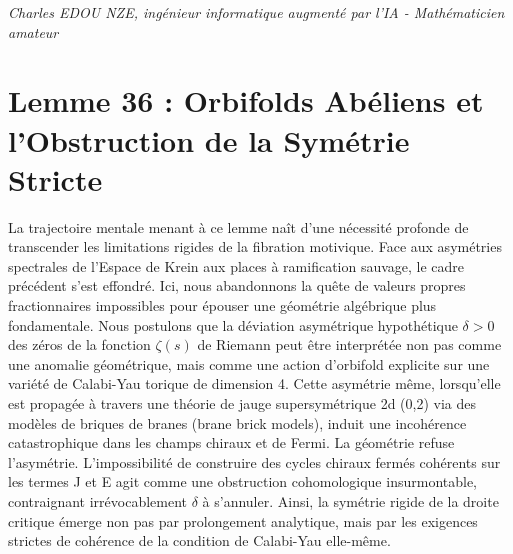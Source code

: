 \documentclass[
]{article}
\begin{document}
\vspace{1cm}
\begin{flushright}
\textit{Charles EDOU NZE, ingénieur informatique augmenté par l'IA - Mathématicien amateur}
\end{flushright}

\section*{Lemme 36 : Orbifolds Abéliens et l'Obstruction de la Symétrie Stricte}

La trajectoire mentale menant à ce lemme naît d'une nécessité profonde de transcender les limitations rigides de la fibration motivique. Face aux asymétries spectrales de l'Espace de Krein aux places à ramification sauvage, le cadre précédent s'est effondré. Ici, nous abandonnons la quête de valeurs propres fractionnaires impossibles pour épouser une géométrie algébrique plus fondamentale. Nous postulons que la déviation asymétrique hypothétique $\delta > 0$ des zéros de la fonction $\zeta(s)$ de Riemann peut être interprétée non pas comme une anomalie géométrique, mais comme une action d'orbifold explicite sur une variété de Calabi-Yau torique de dimension 4. Cette asymétrie même, lorsqu'elle est propagée à travers une théorie de jauge supersymétrique 2d (0,2) via des modèles de briques de branes (brane brick models), induit une incohérence catastrophique dans les champs chiraux et de Fermi. La géométrie refuse l'asymétrie. L'impossibilité de construire des cycles chiraux fermés cohérents sur les termes J et E agit comme une obstruction cohomologique insurmontable, contraignant irrévocablement $\delta$ à s'annuler. Ainsi, la symétrie rigide de la droite critique émerge non pas par prolongement analytique, mais par les exigences strictes de cohérence de la condition de Calabi-Yau elle-même.
\end{document}
